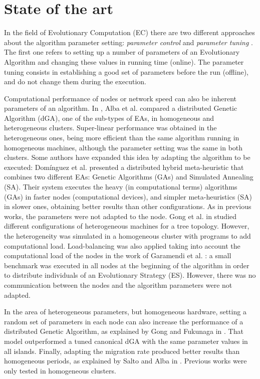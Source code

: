 \documentclass[final,1p,times]{elsarticle}
\begin{document}
%
\section{State of the art}
\label{sec:soa}
%

In the field of  Evolutionary Computation (EC) there are two different approaches about the algorithm parameter setting: {\em parameter control} and {\em parameter tuning} \cite{PARAMETERTUNING}. The first one refers to setting up a number of parameters of an Evolutionary Algorithm  and changing these values in running time (online). The parameter tuning consists in establishing a good set of parameters before the run (offline), and do not change them during the execution.

 Computational performance of nodes or network speed can also be inherent parameters of an algorithm. In \cite{HETEROGENEOUSHARD}, Alba et al. compared a distributed Genetic Algorithm (dGA), one of the sub-types of EAs, in homogeneous and heterogeneous clusters. Super-linear performance was obtained in the heterogeneous ones, being more efficient than the same algorithm running in homogeneous machines, although the parameter setting was the same in both clusters. Some authors have expanded this idea by adapting the algorithm to be executed: Dom\'inguez et al. \cite{HYDROCM} presented a distributed hybrid meta-heuristic that combines two different EAs: Genetic Algorithms (GAs) and Simulated Annealing (SA). Their system executes the heavy (in computational terms) algorithms (GAs) in faster nodes (computational devices), and simpler meta-heuristics (SA) in slower ones, obtaining better results than other configurations. As in previous works, the parameters were not adapted to the node. Gong et al. in \cite{HETEROGENEOUSTOPOLOGY} studied different configurations of heterogeneous machines for a tree topology. However, the heterogeneity was simulated in a homogeneous cluster with programs to add computational load. Load-balancing was also applied taking into account the computational load of the nodes in the work of Garamendi et al. \cite{PARALLELIMPLEMENTATION}: a small benchmark was executed in all nodes at the beginning of the algorithm in order to distribute individuals of an Evolutionary Strategy (ES). However, there was no communication between the nodes and the algorithm parameters were not adapted. 

In the area of heterogeneous parameters, but homogeneous hardware, setting a random set of parameters in each node can also increase the performance of a distributed Genetic Algorithm, as explained by Gong and Fukunaga in \cite{HETEROGENEOUSPARAMETERS}. That model outperformed a tuned canonical dGA with the same parameter values in all islands. Finally, adapting the migration rate produced better results than homogeneous periods, as explained by Salto and Alba in \cite{HETEROGENEOUSMIGRATION}. Previous works were only tested in homogeneous clusters.
\end{document}
